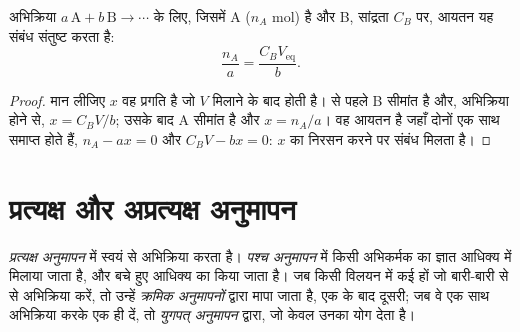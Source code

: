 \begin{proposition}[तुल्यता संबंध]\label{prop:b1:titration-methods:equivalence}
 अभिक्रिया $a\,\mathrm{A} + b\,\mathrm{B} \to \cdots$ के लिए, जिसमें
 A ($n_A$ mol) है और  B, सांद्रता $C_B$ पर, 
आयतन यह संबंध संतुष्ट करता है:
\[
  \frac{n_A}{a} = \frac{C_B V_{\mathrm{eq}}}{b} .
\]
\end{proposition}

\begin{proof}
मान लीजिए $x$ वह प्रगति है जो $V$  मिलाने के बाद होती है।  से पहले B
सीमांत है और, अभिक्रिया  होने से, $x = C_BV/b$; उसके बाद
A सीमांत है और $x = n_A/a$।  वह आयतन है जहाँ दोनों
एक साथ समाप्त होते हैं, $n_A - ax = 0$ और $C_BV - bx = 0$: $x$ का निरसन करने पर
संबंध मिलता है।
\end{proof}

\section{प्रत्यक्ष और अप्रत्यक्ष अनुमापन}

\begin{definition}[अनुमापन के प्रकार]\label{def:b1:titration-methods:kinds}
\emph{प्रत्यक्ष अनुमापन} में  स्वयं
 से अभिक्रिया करता है। \emph{पश्च अनुमापन} में
किसी अभिकर्मक का ज्ञात आधिक्य  में मिलाया जाता है, और बचे हुए आधिक्य का
 किया जाता है। जब किसी विलयन में कई  हों जो
बारी-बारी से  से अभिक्रिया करें, तो उन्हें \emph{क्रमिक
अनुमापनों} द्वारा मापा जाता है, एक  के बाद दूसरी;
जब वे एक साथ अभिक्रिया करके एक ही  दें, तो \emph{युगपत्
अनुमापन} द्वारा, जो
केवल उनका योग देता है।
\end{definition}

